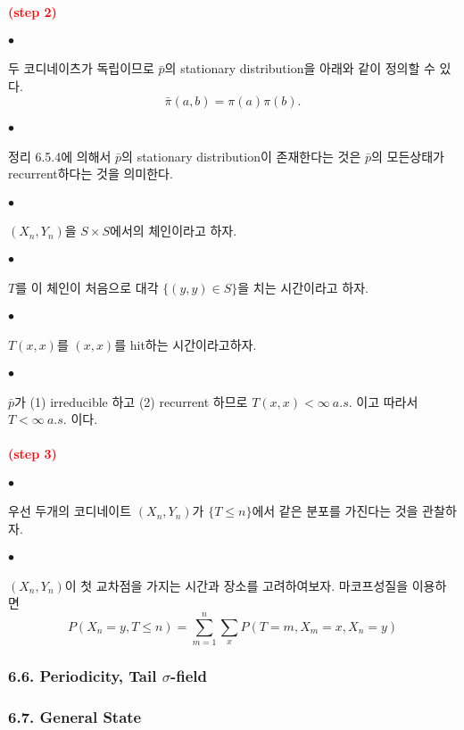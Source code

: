 \documentclass[12pt,oneside,english]{book}
\def\ck{\paragraph{\Large$\bullet$}\Large}
\newcommand{\parared}[1]{\paragraph{\Large\textcolor{red}{(#1)}}\Large}
\begin{document}
\parared{step 2} 
\ck 두 코디네이츠가 독립이므로 ${\bar p}$의 stationary distribution을 아래와 같이 정의할 수 있다. 
\[
\bar{\pi}(a,b)=\pi(a)\pi(b).
\]

\ck 정리 6.5.4에 의해서 $\bar{p}$의 stationary distribution이 존재한다는 것은 $\bar{p}$의 모든상태가 recurrent하다는 것을 의미한다. 

\ck $(X_n,Y_n)$을 $S \times S$에서의 체인이라고 하자. 

\ck $T$를 이 체인이 처음으로 대각 $\{(y,y)\in S\}$을 치는 시간이라고 하자. 

\ck $T(x,x)$를 $(x,x)$를 hit하는 시간이라고하자. 

\ck $\bar{p}$가 (1) irreducible 하고 (2) recurrent 하므로 $T(x,x)<\infty ~ a.s.$ 이고 따라서 $T <\infty ~ a.s.$ 이다. 

\parared{step 3} 

\ck 우선 두개의 코디네이트 $(X_n,Y_n)$가 $\{T\leq n\}$에서 같은 분포를 가진다는 것을 관찰하자. 

\ck $(X_n,Y_n)$이 첫 교차점을 가지는 시간과 장소를 고려하여보자. 마코프성질을 이용하면 
\[
P(X_n=y,T\leq n)= \sum_{m=1}^{n}\sum_xP(T=m,X_m=x,X_n=y)
\]


\subsubsection{6.6. Periodicity, Tail $\sigma$-field}

\subsubsection{6.7. General State}
\end{document}
